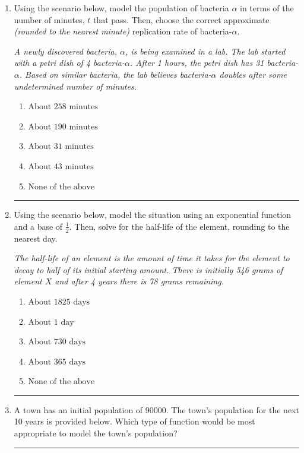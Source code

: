 \documentclass[14pt]{extbook}
\newcommand{\litem}[1]{\item#1\hspace*{-1cm}\rule{\textwidth}{0.4pt}}
\begin{document}
\begin{enumerate}
\litem{
Using the scenario below, model the population of bacteria $\alpha$ in terms of the number of minutes, $t$ that pass. Then, choose the correct approximate \textit{(rounded to the nearest minute)} replication rate of bacteria-$\alpha$.
\begin{center}
    \textit{ A newly discovered bacteria, $\alpha$, is being examined in a lab. The lab started with a petri dish of 4 bacteria-$\alpha$. After 1 hours, the petri dish has 31 bacteria-$\alpha$. Based on similar bacteria, the lab believes bacteria-$\alpha$ doubles after some undetermined number of minutes. }
\end{center}
\begin{enumerate}[label=\Alph*.]
\item \( \text{About } 258 \text{ minutes} \)
\item \( \text{About } 190 \text{ minutes} \)
\item \( \text{About } 31 \text{ minutes} \)
\item \( \text{About } 43 \text{ minutes} \)
\item \( \text{None of the above} \)

\end{enumerate} }
\litem{
Using the scenario below, model the situation using an exponential function and a base of $\frac{1}{2}$. Then, solve for the half-life of the element, rounding to the nearest day.
\begin{center}
    \textit{ The half-life of an element is the amount of time it takes for the element to decay to half of its initial starting amount. There is initially 546 grams of element $X$ and after 4 years there is 78 grams remaining. }
\end{center}
\begin{enumerate}[label=\Alph*.]
\item \( \text{About } 1825 \text{ days} \)
\item \( \text{About } 1 \text{ day} \)
\item \( \text{About } 730 \text{ days} \)
\item \( \text{About } 365 \text{ days} \)
\item \( \text{None of the above} \)

\end{enumerate} }
\litem{
A town has an initial population of 90000. The town's population for the next 10 years is provided below. Which type of function would be most appropriate to model the town's population?

}
\end{enumerate}
\end{document}

